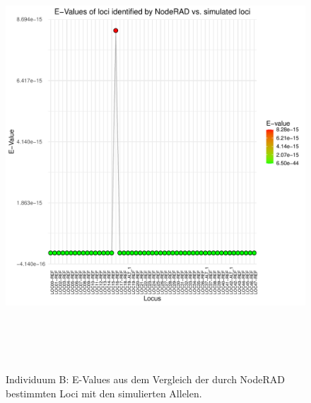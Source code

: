 \begin{figure}[H]
	\begin{center}
		\includegraphics[height=16cm]{bilder/evaluation/evalues/B.plot_evalues.pdf}
		\caption{Individuum B: E-Values aus dem Vergleich der durch NodeRAD bestimmten Loci mit den simulierten Allelen.}
	\end{center}
\end{figure}

